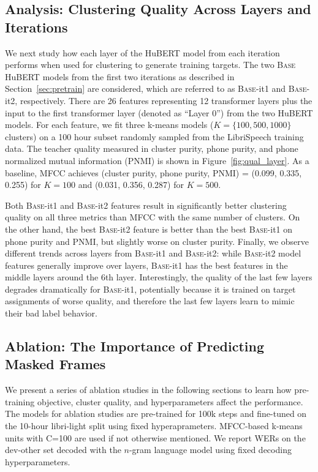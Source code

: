 \subsection{Analysis: Clustering Quality Across Layers and Iterations}
We next study how each layer of the HuBERT model from each iteration performs when used for clustering to generate training targets.
The two \textsc{Base} HuBERT models from the first two iterations as described in Section~\ref{sec:pretrain} are considered, which are referred to as \textsc{Base}-it1 and \textsc{Base}-it2, respectively. There are 26 features representing 12 transformer layers plus the input to the first transformer layer (denoted as ``Layer 0'') from the two HuBERT models.
For each feature, we fit three k-means models ($K=\{100, 500, 1000\}$ clusters) on a 100 hour subset randomly sampled from the LibriSpeech training data. The teacher quality measured in cluster purity, phone purity, and phone normalized mutual information (PNMI) is shown in Figure~\ref{fig:qual_layer}.
As a baseline, MFCC achieves (cluster purity, phone purity, PNMI) = (0.099, 0.335, 0.255) for $K=100$ and (0.031, 0.356, 0.287) for $K=500$.

Both \textsc{Base}-it1 and \textsc{Base}-it2 features result in significantly better clustering quality on all three metrics than MFCC with the same number of clusters. On the other hand, the best \textsc{Base}-it2 feature is better than the best \textsc{Base}-it1 on phone purity and PNMI, but slightly worse on cluster purity.
Finally, we observe different trends across layers from \textsc{Base}-it1 and \textsc{Base}-it2: while \textsc{Base}-it2 model features generally improve over layers, \textsc{Base}-it1 has the best features in the middle layers around the 6th layer. Interestingly, the quality of the last few layers degrades dramatically for \textsc{Base}-it1, potentially because it is trained on target assignments of worse quality, and therefore the last few layers learn to mimic their bad label behavior.

\subsection{Ablation: The Importance of Predicting Masked Frames}
We present a series of ablation studies in the following sections to learn how pre-training objective, cluster quality, and hyperparameters affect the performance. 
The models for ablation studies are pre-trained for 100k steps and fine-tuned on the 10-hour libri-light split using fixed hyperaprameters. MFCC-based k-means units with C=100 are used if not otherwise mentioned. We report WERs on the dev-other set decoded with the $n$-gram language model using fixed decoding hyperparameters.

